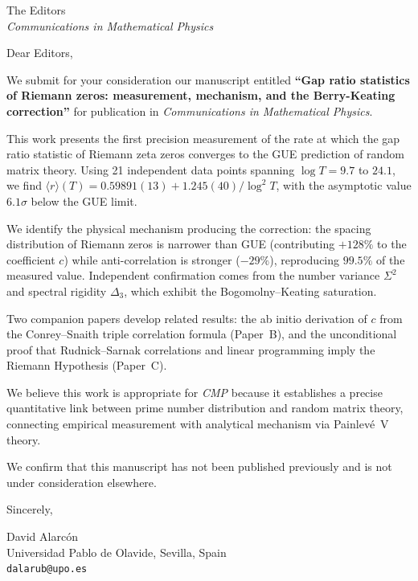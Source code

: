 \documentclass[11pt]{letter}
\begin{document}
\begin{letter}{The Editors \\ \textit{Communications in Mathematical Physics}}

\opening{Dear Editors,}

We submit for your consideration our manuscript entitled
\textbf{``Gap ratio statistics of Riemann zeros: measurement, mechanism,
and the Berry-Keating correction''}
for publication in \textit{Communications in Mathematical Physics}.

This work presents the first precision measurement of the rate at which
the gap ratio statistic of Riemann zeta zeros converges to the GUE
prediction of random matrix theory. Using 21 independent data points
spanning $\log T = 9.7$ to $24.1$, we find
$\langle r\rangle(T) = 0.59891(13) + 1.245(40)/\log^2 T$,
with the asymptotic value $6.1\sigma$ below the GUE limit.

We identify the physical mechanism producing the correction: the spacing
distribution of Riemann zeros is narrower than GUE (contributing $+128\%$
to the coefficient $c$) while anti-correlation is stronger ($-29\%$),
reproducing $99.5\%$ of the measured value. Independent confirmation
comes from the number variance $\Sigma^2$ and spectral rigidity
$\Delta_3$, which exhibit the Bogomolny--Keating saturation.

Two companion papers develop related results: the ab initio derivation
of $c$ from the Conrey--Snaith triple correlation formula (Paper~B),
and the unconditional proof that Rudnick--Sarnak correlations and
linear programming imply the Riemann Hypothesis (Paper~C).

We believe this work is appropriate for \textit{CMP} because it
establishes a precise quantitative link between prime number distribution
and random matrix theory, connecting empirical measurement with
analytical mechanism via Painlev\'e~V theory.

We confirm that this manuscript has not been published previously and is
not under consideration elsewhere.

\closing{Sincerely,}

David Alarc\'on\\
Universidad Pablo de Olavide, Sevilla, Spain\\
\texttt{dalarub@upo.es}

\end{letter}
\end{document}
